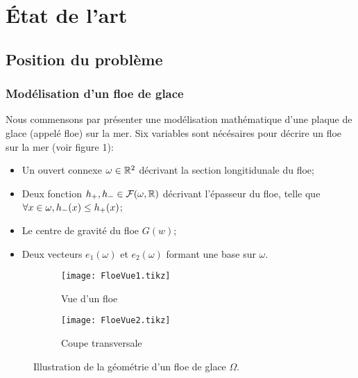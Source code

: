 

\chapter{État de l'art} %

\label{Chapter3} %



\section{Position du problème}

\subsection{Modélisation d'un floe de glace}

Nous commensons par présenter une modélisation mathématique d'une plaque de glace (appelé floe) sur la mer. Six variables sont nécésaires pour décrire un floe sur la mer (voir figure 1): 
\begin{itemize}
    \item Un ouvert connexe $\omega \in \mathbb{R}^2$ décrivant la section longitidunale du floe;
    \item Deux fonction $h_{+}, h_{-} \in \mathcal{F}(\omega, \mathbb{R})$ décrivant l'épasseur du floe, telle que $\forall x \in \omega, h_{-}(x) \leq h_{+}(x)$;
    \item Le centre de gravité du floe $G(w)$;
    \item Deux vecteurs $e_1(\omega)$ et $e_2(\omega)$ formant une base sur $\omega$.
\end{itemize}

\begin{figure}[H]
    \centering
    \begin{subfigure}[b]{0.45\textwidth}
        \centering
        \texttt{[image: FloeVue1.tikz]} 
        \caption{Vue d'un floe}
    \end{subfigure}
    \begin{subfigure}[b]{0.45\textwidth}
        \centering
        \texttt{[image: FloeVue2.tikz]} 
        \caption{Coupe transversale}
        \label{fig:flo2}
    \end{subfigure}
       \caption{Illustration de la géométrie d'un floe de glace $\Omega$.}
       \label{fig:floe}
\end{figure}

